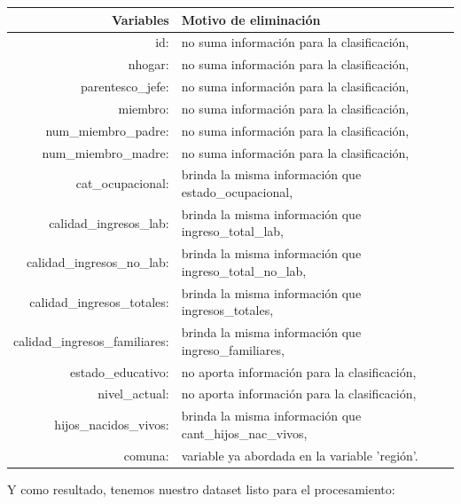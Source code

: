 \documentclass[a4paper]{article}
\begin{document}
        \begin{tabular}{rl}
            \textbf{Variables}              & \textbf{Motivo de eliminación} \\ \hline
            id:                             & no suma información para la clasificación, \\
            nhogar:                         & no suma información para la clasificación, \\
            parentesco\_jefe:               & no suma información para la clasificación, \\
            miembro:                        & no suma información para la clasificación, \\
            num\_miembro\_padre:            & no suma información para la clasificación, \\
            num\_miembro\_madre:            & no suma información para la clasificación, \\
            cat\_ocupacional:               & brinda la misma información que estado\_ocupacional, \\
            calidad\_ingresos\_lab:         & brinda la misma información que ingreso\_total\_lab, \\
            calidad\_ingresos\_no\_lab:     & brinda la misma información que ingreso\_total\_no\_lab, \\
            calidad\_ingresos\_totales:     & brinda la misma información que ingresos\_totales, \\
            calidad\_ingresos\_familiares:  & brinda la misma información que ingreso\_familiares, \\
            estado\_educativo:              & no aporta información para la clasificación, \\
            nivel\_actual:                  & no aporta información para la clasificación, \\
            hijos\_nacidos\_vivos:          & brinda la misma información que cant\_hijos\_nac\_vivos, \\
            comuna:                         & variable ya abordada en la variable 'región'. \\
        \end{tabular}

        Y como resultado, tenemos nuestro dataset listo para el procesamiento:
\end{document}

